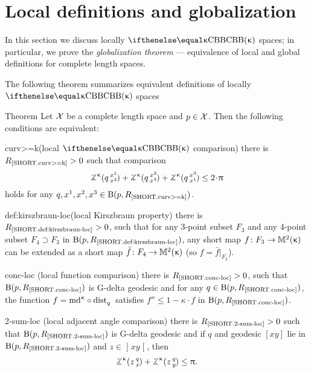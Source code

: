 \section{Local definitions and globalization}\label{sec:loc}


In this section we discuss locally $\Alex{\kappa}$ spaces; 
in particular, we prove the \emph{globalization theorem} --- equivalence of local and global definitions for complete length spaces.

The following theorem summarizes equivalent definitions of locally $\Alex{\kappa}$ spaces

\begin{thm}{Theorem}\label{thm:=def-loc}
Let $\mathcal{X}$ be a complete length space and $p\in \spc{X}$.
Then the following conditions are equivalent:
\begin{subthmN}
{curv>=k}(local $\Alex\kappa$ comparison) there is $R_{\hbox{\rm\scriptsize\ref{SHORT.curv>=k}}}>0$ such that comparison 
\[\angk\kappa q{x^1}{x^2}
+\angk\kappa q{x^2}{x^3}
+\angk\kappa q{x^3}{x^1}
\le 2\cdot\pi\]
holds for any $q,x^1,x^2,x^3\in \oBall(p,R_{\hbox{\rm\scriptsize\ref{SHORT.curv>=k}}})$.
\end{subthmN}

\begin{subthmN}{def:kirszbraun-loc}(local Kirszbraun property) 
there is $R_{\hbox{\rm\scriptsize\ref{SHORT.def:kirszbraun-loc}}}>0$, 
such that for any 3-point subset $F_3$ and any 4-point subset $F_4\supset F_3$ in $\mathrm{B}{}(p,R_{\hbox{\rm\scriptsize\ref{SHORT.def:kirszbraun-loc}}})$, any short map $f\:F_3\to\Lob2\kappa$ can be extended as a short map $\bar f\:F_4\to\Lob2\kappa$ (so $f=\bar f|_{F_3}$).
\end{subthmN}

\begin{subthmN}{conc-loc} (local function comparison) there is 
$R_{\hbox{\rm\scriptsize\ref{SHORT.conc-loc}}}>0$, such that 
$\mathrm{B}{}(p,R_{\hbox{\rm\scriptsize\ref{SHORT.conc-loc}}})$ 
is G-delta geodesic and for any 
$q\in \oBall(p,R_{\hbox{\rm\scriptsize\ref{SHORT.conc-loc}}})$, 
the function $f=\md\kappa\circ\distfun{q}{}{}$ satisfies 
$f''\le 1-\kappa\cdot  f$ in
$\mathrm{B}{}(p,R_{\hbox{\rm\scriptsize\ref{SHORT.conc-loc}}})$.
\end{subthmN}

\begin{subthmN}{2-sum-loc} (local adjacent angle comparison) there is
$R_{\hbox{\rm\scriptsize\ref{SHORT.2-sum-loc}}}>0$ 
such that $\mathrm{B}{}(p,R_{\hbox{\rm\scriptsize\ref{SHORT.2-sum-loc}}})$ 
is G-delta geodesic and if $q$ and geodesic $[x y]$ lie in
$\mathrm{B}{}(p,R_{\hbox{\rm\scriptsize\ref{SHORT.2-sum-loc}}})$ 
and $z\in \mathopen{]}x y\mathclose{[}$, then
\[\angk\kappa z q x
+\angk\kappa z q y
\le \pi.\]
\end{subthmN}


\end{thm}
